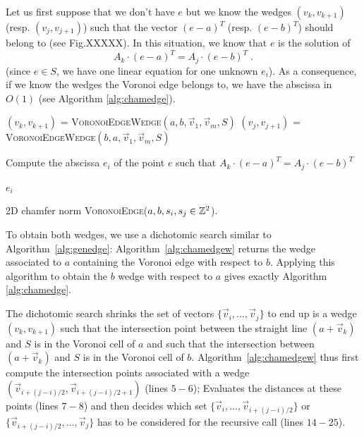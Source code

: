 \documentclass{llncs}
\begin{document}
Let us first suppose that we don't have $e$ but we know the wedges
$(v_{k},v_{k+1})$ (resp. $(v_j,v_{j+1})$) such that the vector
$(e-a)^T$ (resp. $(e-b)^T$) should belong to (see Fig.XXXXX). In this
situation, we know that $e$ is the solution of
\begin{equation}
\label{eq:3}
  A_k\cdot  (e-a)^T = A_j\cdot (e -b)^T\;.
\end{equation}
(since $e\in S$, we have one linear equation for one unknown
$e_i$). As a consequence, if we know the wedges the Voronoi edge
belongs to, we have the abscissa in $O(1)$ (see Algorithm \ref{alg:chamedge}).
\begin{algorithm}[h]\small
  $(v_k,v_{k+1})$ = \textsc{VoronoiEdgeWedge}$(a,b,\vec{v}_1,\vec{v}_m, S)$\;
  $(v_j,v_{j+1})$ = \textsc{VoronoiEdgeWedge}$(b,a,\vec{v}_1,\vec{v}_m, S)$\;

  Compute the abscissa $e_i$ of the point $e$ such that $A_k\cdot
  (e-a)^T = A_j\cdot (e -b)^T$\;

  \Return $e_i$\;
  \caption{2D chamfer norm \textsc{VoronoiEdge}($a,b,s_i,s_j\in{\mathbb{Z}}^2$).\label{alg:chamedge}}
\end{algorithm}
To obtain both wedges, we use a dichotomic search similar to
Algorithm~\ref{alg:genedge}: Algorithm~\ref{alg:chamedgew} returns the
wedge associated to $a$ containing the Voronoi edge with respect to
$b$. Applying this algorithm to obtain the $b$ wedge with respect to
$a$ gives exactly  Algorithm \ref{alg:chamedge}.

The dichotomic search shrinks the set of vectors
$\{\vec{v}_i,\ldots,\vec{v}_j\}$ to end up is a wedge $(v_k,v_{k+1})$
such that the intersection point between the straight line $(a +
\vec{v}_k)$ and $S$ is in the Voronoi cell of $a$ and such that the
intersection between $(a + \vec{v}_k)$ and $S$ is in the Voronoi cell
of $b$. Algorithm~\ref{alg:chamedgew} thus first compute the
intersection points associated with a wedge $(\vec{v}_{i+(j-i)/2},
\vec{v}_{i+(j-i)/2+1})$ (lines $5-6$); Evaluates the distances at
these points (lines $7-8$) and then decides which set
$\{\vec{v}_i,\ldots,\vec{v}_{i+(j-i)/2}\}$ or
$\{\vec{v}_{i+(j-i)/2},\ldots,\vec{v}_j\}$ has to be considered for
the recursive call (lines $14-25$).
\end{document}
